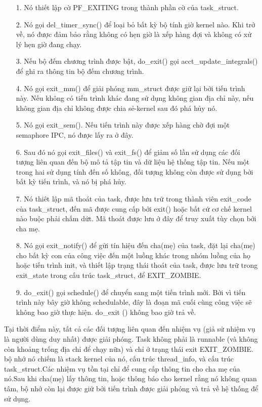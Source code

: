 \documentclass[a4paper,10pt]{report}
\begin{document}
\begin{itemize}
\item[1. ] Nó thiết lập cờ PF\_EXITING trong thành phần cờ của task\_struct.
\item[2. ] Nó gọi del\_timer\_sync() để loại bỏ bất kỳ bộ tính giờ kernel nào. Khi trở về, nó được đảm bảo rằng không có hẹn giờ là xếp hàng đợi và không có xử lý hẹn giờ đang chạy.
\item[3. ] Nếu bộ đếm chương trình được bật, do\_exit() gọi acct\_update\_integrals() để ghi ra thông tin bộ đếm chương trình.
\item[4. ] Nó gọi exit\_mm() để giải phóng mm\_struct được giữ lại bởi tiến trình này. Nếu không có tiến trình khác đang sử dụng không gian địa chỉ này, nếu không gian địa chỉ không được chia sẻ-kernel sau đó phá hủy nó.
\item[5. ] Nó gọi exit\_sem(). Nếu tiến trình này được xếp hàng chờ đợi một semaphore IPC, nó được lấy ra ở đây.
\item[6. ] Sau đó nó gọi exit\_files() và exit\_fs() để giảm số lần sử dụng các đối tượng liên quan đến bộ mô tả tập tin và dữ liệu hệ thống tập tin. Nếu một trong hai sử dụng tính đến số không, đối tượng không còn được sử dụng bởi bất kỳ tiến trình, và nó bị phá hủy.
\item[7. ] Nó thiêt lập mã thoát của task, được lưu trữ trong thành viên exit\_code của task\_struct, đến mã được cung cấp bởi exit() hoặc bất cứ cơ chế kernel nào buộc phải chấm dứt. Mã thoát được lưu ở đây để truy xuất tùy chọn bởi cha mẹ.
\item[8. ] Nó gọi exit\_notify() để gửi tín hiệu đến cha(mẹ) của task, đặt lại cha(mẹ) cho bất kỳ con của công việc đến một luồng khác trong nhóm luồng của họ hoặc tiến trình init, và thiết lập trạng thái thoát của task, được lưu trữ trong exit\_state trong cấu trúc task\_struct, để EXIT\_ZOMBIE.
\item[9. ] do\_exit() gọi schedule() để chuyển sang một tiến trình mới. Bởi vì tiến trình này bây giờ không schedulable, đây là đoạn mã cuối cùng công việc sẽ không bao giờ thực hiện. do\_exit () không bao giờ trả về.
\end{itemize}
Tại thời điểm này, tất cả các đối tượng liên quan đến nhiệm vụ (giả sử nhiệm vụ là người dùng duy nhất) được giải phóng. Task không phải là runnable (và không còn khoảng trống địa chỉ để chạy nữa) và chỉ ở trạng thái exit EXIT\_ZOMBIE. bộ nhớ nó chiếm là stack kernel của nó, cấu trúc thread\_info, và cấu trúc task\_struct.Các nhiệm vụ tồn tại chỉ để cung cấp thông tin cho cha mẹ của nó.Sau khi cha(mẹ) lấy thông tin, hoặc thông báo cho kernel rằng nó không quan tâm, bộ nhớ còn lại được giữ bởi tiến trình được giải phóng và trả về hệ thống để sử dụng.
\end{document}
